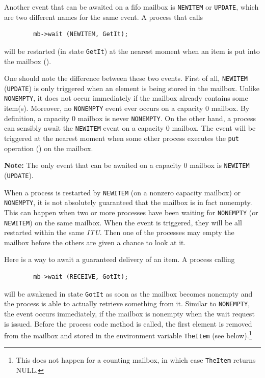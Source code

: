 Another event that can be awaited on a fifo mailbox is {\tt NEWITEM}
or {\tt UPDATE}, which are two different names for the same event.
A process that calls
\begin{verbatim}
        mb->wait (NEWITEM, GetIt);
\end{verbatim}
will be restarted (in state {\tt GetIt})
at the nearest moment when an item is put into the mailbox ().

One should note the difference between these two events.
First of all, {\tt NEWITEM} ({\tt UPDATE})
is only triggered when an element is being stored in the mailbox.
Unlike {\tt NONEMPTY}, it does not occur immediately if the mailbox
already contains some item(s).
Moreover, no {\tt NONEMPTY} event ever occurs on a capacity 0 mailbox.
By definition, a capacity 0 mailbox is never {\tt NONEMPTY}.
On the other hand, a process can sensibly 
await the {\tt NEWITEM} event on a capacity 0 mailbox.
The event will be triggered at the nearest moment when some other process
executes the {\tt put} operation () on the mailbox.

\noindent
{\bf Note:} The only event that can be awaited on a capacity 0 mailbox
is {\tt NEWITEM} ({\tt UPDATE}).

\medskip

When a process is restarted by {\tt NEWITEM} (on a nonzero capacity
mailbox) or {\tt NONEMPTY}, it is not absolutely
guaranteed that the mailbox is in fact nonempty.
This can happen when
two or more processes have been waiting for {\tt NONEMPTY} (or
{\tt NEWITEM}) on the same mailbox.
When the event is triggered,
they will be all restarted within the same {\em ITU}.
Then one of the processes may empty the mailbox before the others are
given a chance to look at it.

Here is a way to await a guaranteed delivery of an item.
A process calling
\begin{verbatim}
        mb->wait (RECEIVE, GotIt);
\end{verbatim}
will be awakened in state {\tt GotIt} as soon as the mailbox becomes
nonempty and the process is able to actually retrieve something from it.
Similar to {\tt NONEMPTY}, the event occurs immediately, if the
mailbox is nonempty when the wait request is issued.
Before the process code method is called, the first element is
removed from the mailbox and stored in the environment variable
{\tt TheItem} (see below).\footnote{This does not happen for a counting
mailbox, in which case {\tt TheItem} returns NULL.}

